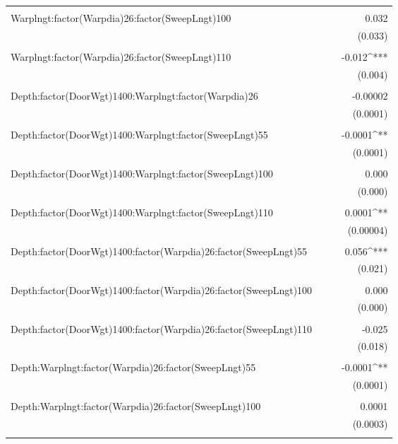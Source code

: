 \documentclass[12pt]{article}\usepackage[]{graphicx}\usepackage[]{color}
\begin{document}
\begin{table}[H]
\begin{tabular}{@{\extracolsep{5pt}}lD{.}{.}{-3} D{.}{.}{-3} D{.}{.}{-3} }
  & & & \\ 
 Warplngt:factor(Warpdia)26:factor(SweepLngt)100 &  &  & 0.032 \\ 
  &  &  & (0.033) \\ 
  & & & \\ 
 Warplngt:factor(Warpdia)26:factor(SweepLngt)110 &  &  & -0.012^{***} \\ 
  &  &  & (0.004) \\ 
  & & & \\ 
 Depth:factor(DoorWgt)1400:Warplngt:factor(Warpdia)26 &  &  & -0.00002 \\ 
  &  &  & (0.0001) \\ 
  & & & \\ 
 Depth:factor(DoorWgt)1400:Warplngt:factor(SweepLngt)55 &  &  & -0.0001^{**} \\ 
  &  &  & (0.0001) \\ 
  & & & \\ 
 Depth:factor(DoorWgt)1400:Warplngt:factor(SweepLngt)100 &  &  & 0.000 \\ 
  &  &  & (0.000) \\ 
  & & & \\ 
 Depth:factor(DoorWgt)1400:Warplngt:factor(SweepLngt)110 &  &  & 0.0001^{**} \\ 
  &  &  & (0.00004) \\ 
  & & & \\ 
 Depth:factor(DoorWgt)1400:factor(Warpdia)26:factor(SweepLngt)55 &  &  & 0.056^{***} \\ 
  &  &  & (0.021) \\ 
  & & & \\ 
 Depth:factor(DoorWgt)1400:factor(Warpdia)26:factor(SweepLngt)100 &  &  & 0.000 \\ 
  &  &  & (0.000) \\ 
  & & & \\ 
 Depth:factor(DoorWgt)1400:factor(Warpdia)26:factor(SweepLngt)110 &  &  & -0.025 \\ 
  &  &  & (0.018) \\ 
  & & & \\ 
 Depth:Warplngt:factor(Warpdia)26:factor(SweepLngt)55 &  &  & -0.0001^{**} \\ 
  &  &  & (0.0001) \\ 
  & & & \\ 
 Depth:Warplngt:factor(Warpdia)26:factor(SweepLngt)100 &  &  & 0.0001 \\ 
  &  &  & (0.0003) \\ 
  & & & \\ 

\end{tabular}
\end{table}
\end{document}
